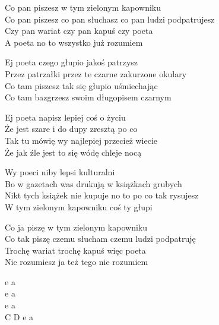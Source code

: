 \begin{text}

    Co pan piszesz w tym zielonym kapowniku\\
    Co pan piszesz co pan słuchasz co pan ludzi podpatrujesz\\
    Czy pan wariat czy pan kapuś czy poeta\\
    A poeta no to wszystko już rozumiem

    Ej poeta czego głupio jakoś patrzysz\\
    Przez patrzałki przez te czarne zakurzone okulary\\
    Co tam piszesz tak się głupio uśmiechając\\
    Co tam bazgrzesz swoim długopisem czarnym

    Ej poeta napisz lepiej coś o życiu\\
    Że jest szare i do dupy zresztą po co\\
    Tak tu mówię wy najlepiej przecież wiecie\\
    Że jak źle jest to się wódę chleje nocą

    Wy poeci niby lepsi kulturalni\\
    Bo w gazetach was drukują w książkach grubych\\
    Nikt tych książek nie kupuje no to po co tak rysujesz\\
    W tym zielonym kapowniku coś ty głupi

    Co ja piszę w tym zielonym kapowniku\\
    Co tak piszę czemu słucham czemu ludzi podpatruję\\
    Trochę wariat trochę kapuś więc poeta\\
    Nie rozumiesz ja też tego nie rozumiem
    
\end{text}
\begin{chord}
    \small{
    e a\\
    e a\\
    e a\\
    C D e a
    }
\end{chord}